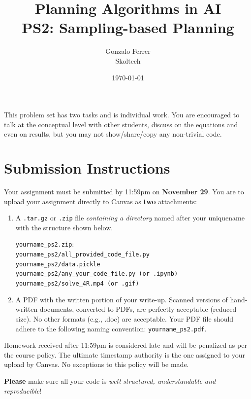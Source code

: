 \documentclass[11pt, oneside, letterpaper]{article}
\begin{document}
\title{\huge\textbf{Planning Algorithms in AI \\  PS2: Sampling-based Planning}}
\author{Gonzalo Ferrer\\Skoltech}
\date{\today}
\maketitle

This problem set has two tasks  and is individual work. You are encouraged to talk at the conceptual level with other students, discuss on the equations and even on results, but you may not show/share/copy any non-trivial code.


\section*{Submission Instructions}
Your assignment must be submitted by 11:59pm on {\bf November 29}. You are to upload your assignment directly to Canvas as {\bf two} attachments:

\begin{enumerate}
\item A \texttt{.tar.gz} or \texttt{.zip} file \textit{containing a directory} named after your uniquename with the structure shown below.

\texttt{yourname\_ps2.zip}:\\
\texttt{yourname\_ps2/all\_provided\_code\_file.py}\\
\texttt{yourname\_ps2/data.pickle}\\
\texttt{yourname\_ps2/any\_your\_code\_file.py (or .ipynb)}\\
\texttt{yourname\_ps2/solve\_4R.mp4 (or .gif)}\\


\item A PDF with the written portion of your write-up. Scanned versions of hand-written documents, converted to PDFs, are perfectly acceptable (reduced size).  No other formats (e.g., .doc) are  acceptable.  Your PDF file should adhere to the following naming convention: \texttt{yourname\_ps2.pdf}.

\end{enumerate}

Homework received after 11:59pm is considered late and will be penalized as per the course policy. The ultimate timestamp authority is the one assigned to your upload by Canvas.  No exceptions to this policy will be made.

\textbf{Please} make sure all your code is \textit{well structured, understandable and reproducible}!
\end{document}
